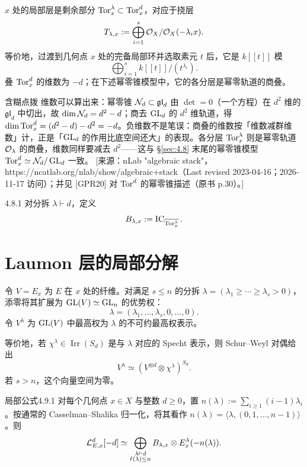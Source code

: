 $x$ 处的局部层是剩余部分 $\operatorname{Tor}_x^\lambda\subset\operatorname{Tor}_x^d$，对应于挠层
\[T_{\lambda,x}:=\bigoplus_{i=1}^s\mathcal{O}_X/\mathcal{O}_X(-\lambda_ix).\]
等价地，过渡到几何点 $x$ 处的完备局部环并选取素元 $t$ 后，它是 $k[[t]]$ 模
\[\bigoplus_{i=1}^sk[[t]]/(t^{\lambda_i}).\]
叠 $\operatorname{Tor}_x^d$ 的维数为 $-d$；在下述幂零锥模型中，它的各分层是幂零轨道的商叠。

\begin{transnote}{含糊点拨}
维数可以算出来：幂零锥 $\mathcal{N}_d\subset\mathfrak{gl}_d$ 由 $\det=0$（一个方程）在 $d^2$ 维的 $\mathfrak{gl}_d$ 中切出，故 $\dim\mathcal{N}_d=d^2-d$；商去 $\operatorname{GL}_d$ 的 $d^2$ 维轨道，得 $\dim\operatorname{Tor}_x^d=(d^2-d)-d^2=-d$。负维数不是笔误：商叠的维数按「维数减群维数」计，正是「$\operatorname{GL}_d$ 的作用比底空间还大」的表现。各分层 $\operatorname{Tor}_x^\lambda$ 则是幂零轨道 $\mathcal{O}_\lambda$ 的商叠，维数同样要减去 $d^2$——这与 \S\ref{sec:4.8} 末尾的幂零锥模型 $\operatorname{Tor}_x^d\simeq\mathcal{N}_d/\operatorname{GL}_d$ 一致。
[来源：nLab "algebraic stack"，https://ncatlab.org/nlab/show/algebraic+stack（Last revised 2023-04-16；2026-11-17 访问）；并见 [GPR20] 对 $\operatorname{Tor}^d$ 的幂零锥描述（原书 p.30）。]
\end{transnote}
\begin{definition}{}{4.8.1}
对分拆 $\lambda\vdash d$，定义
\[B_{\lambda,x}:=\operatorname{IC}_{\overline{\operatorname{Tor}_x^\lambda}}.\]
\end{definition}
\section{Laumon 层的局部分解}\label{sec:4.9}
令 $V=E_x$ 为 $E$ 在 $x$ 处的纤维。对满足 $s\le n$ 的分拆 $\lambda=(\lambda_1\ge\cdots\ge\lambda_s>0)$，添零将其扩展为 $\operatorname{GL}(V)\simeq\operatorname{GL}_n$ 的优势权：
\[\lambda=(\lambda_1,\ldots,\lambda_s,0,\ldots,0).\]
令 $V^\lambda$ 为 $\operatorname{GL}(V)$ 中最高权为 $\lambda$ 的不可约最高权表示。

等价地，若 $\chi^\lambda\in\operatorname{Irr}(S_d)$ 是与 $\lambda$ 对应的 Specht 表示，则 Schur–Weyl 对偶给出
\[V^\lambda\simeq(V^{\otimes d}\otimes\chi^\lambda)^{S_d}.\]
若 $s>n$，这个向量空间为零。
\begin{proposition}{局部公式}{4.9.1}
对每个几何点 $x\in X$ 与整数 $d\ge0$，置 $n(\lambda):=\sum_{i\ge1}(i-1)\lambda_i$。按通常的 Casselman–Shalika 归一化，将其看作 $n(\lambda)=\langle\lambda,(0,1,\ldots,n-1)\rangle$。则
\[\mathcal{L}_{E,x}^d[-d]\simeq\bigoplus_{\substack{\lambda\vdash d\\\ell(\lambda)\le n}}B_{\lambda,x}\otimes E_x^\lambda(-n(\lambda)).\]
\end{proposition}
